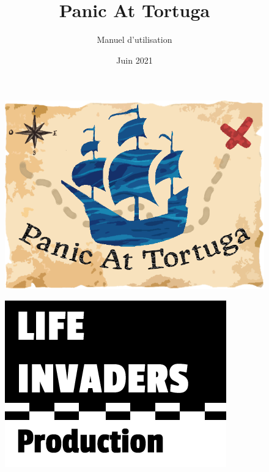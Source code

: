 \documentclass[french]{article}
\title{\fontfamily{phv}\selectfont \Huge \textbf{Panic At Tortuga}}
\author{\fontfamily{phv}\Huge{Manuel d'utilisation}}
\date{\fontfamily{phv}\selectfont Juin 2021}
\begin{document}
\begin{titlepage}
    \maketitle
    
    \thispagestyle{empty}
    \vspace{10pt}
    \begin{figure}[hbt!]
        \centering
        \includegraphics[scale=0.43]{logo.png}
    \end{figure}
    \vspace{10pt}

    \begin{figure}[hbt!]
        \centering
        \includegraphics[scale=0.84]{logo_lifeinvaders_copie.png}
    \end{figure}
\end{titlepage}
\end{document}
